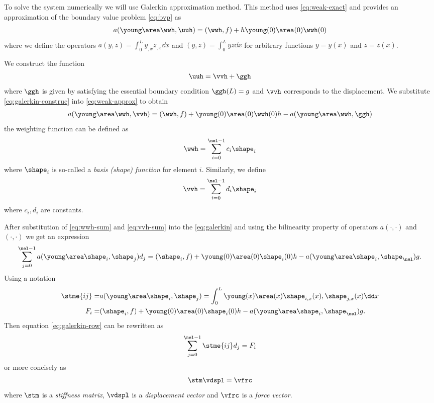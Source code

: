 \documentclass[twoside,a4paper,12pt]{article}
\newcommand{\+}[2]{\newcommand#1{{\color{\notcolor}#2}}}
\newcommand{\1}[2]{\newcommand{#1}[1]{{\color{\notcolor}#2}}}
\newcommand{\2}[2]{\newcommand{#1}[2]{{\color{\notcolor}#2}}}
\begin{document}
To solve the system numerically we will use Galerkin approximation
method. This method uses \eqref{eq:weak-exact} and provides an
approximation of the boundary value problem \eqref{eq:bvp} as
%
\begin{align}
a(\young\area\wwh,\uuh) = (\wwh,f) + h \young(0)\area(0)\wwh(0) \label{eq:weak-approx}
\end{align}
%
where we define the operators $a(y,z) = \int_0^L y_{,x} z_{,x} \dd x$
and $(y,z) = \int_0^L y z \dd x$ for arbitrary functions $y = y(x)$
and $z= z(x)$.

We construct the function
\begin{align}
  \uuh  = \vvh + \ggh \label{eq:galerkin-construc}
\end{align}
%
where $\ggh$ is given by satisfying the essential boundary condition
$\ggh(L) = g$ and $\vvh$ corresponds to the displacement. We
substitute \eqref{eq:galerkin-construc} into \eqref{eq:weak-approx} to
obtain
%
\begin{align}
  a(\young\area\wwh,\vvh) = (\wwh, f) + \young(0)\area(0)\wwh(0)h - 
  a(\young\area\wwh,\ggh)\label{eq:galerkin}
\end{align}
%
the weighting function can be defined as
%
\begin{align}
  \wwh = \sum_{i=0}^{\nel-1} c_i \shape_i \label{eq:wwh-sum}
\end{align}
%
where $\shape_i$ is so-called a \emph{basis (shape) function} for
element $i$. Similarly, we define
%
\begin{align}
  \vvh = \sum_{i=0}^{\nel-1} d_i \shape_i \label{eq:vvh-sum}
\end{align}
where $c_i, d_i$ are constants.

After substitution of \eqref{eq:wwh-sum} and \eqref{eq:vvh-sum} into
the \eqref{eq:galerkin} and using the bilinearity property of
operators $a(\cdot,\cdot)$ and $(\cdot,\cdot)$ we get an expression
%
\begin{align}
  \sum_{j=0}^{\nel-1} a(\young\area\shape_i, \shape_j) d_j = (\shape_i, f) + \young(0)\area(0)\shape_i(0) h - a(\young\area\shape_i,\shape_\nel)g. \label{eq:galerkin-row}
\end{align}
%
Using a notation
%
\begin{align}
  \stme{ij} =& a(\young\area\shape_i,\shape_j) = \int_0^L \young(x)\area(x)\shape_{i,x}(x),\shape_{j,x}(x) \dd x \label{eq:stme} \\ 
  F_i =& (\shape_i,f) + \young(0)\area(0)\shape_i(0) h - a(\young\area\shape_i,\shape_{\nel}) g .
\end{align}
Then equation \eqref{eq:galerkin-row} can be rewritten as
%
\begin{align}
  \sum_{j=0}^{\nel-1} \stme{ij} d_j = F_i
\end{align}
or more concisely as
\begin{align}
\stm \vdspl = \vfrc \label{eq:concise-eq}
\end{align}
where $\stm$ is a \emph{stiffness matrix}, $\vdspl$ is a
\emph{displacement vector} and $\vfrc$ is a \emph{force vector}.
\end{document}
